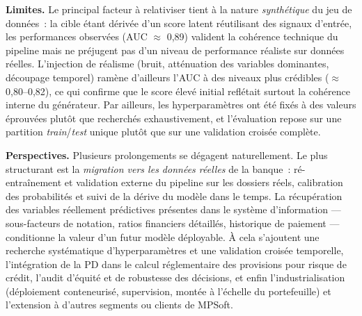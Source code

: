 \documentclass[a4paper,12pt,oneside]{report}
\begin{document}
\medskip
\noindent\textbf{Limites.} Le principal facteur à relativiser tient à la nature
\emph{synthétique} du jeu de données~: la cible étant dérivée d'un score latent réutilisant des
signaux d'entrée, les performances observées (AUC $\approx$ 0{,}89) valident la cohérence
technique du pipeline mais ne préjugent pas d'un niveau de performance réaliste sur données
réelles. L'injection de réalisme (bruit, atténuation des variables dominantes, découpage
temporel) ramène d'ailleurs l'AUC à des niveaux plus crédibles ($\approx$ 0{,}80–0{,}82), ce qui
confirme que le score élevé initial reflétait surtout la cohérence interne du générateur. Par
ailleurs, les hyperparamètres ont été fixés à des valeurs éprouvées plutôt que recherchés
exhaustivement, et l'évaluation repose sur une partition \textit{train}/\textit{test} unique
plutôt que sur une validation croisée complète.

\medskip
\noindent\textbf{Perspectives.} Plusieurs prolongements se dégagent naturellement. Le plus
structurant est la \emph{migration vers les données réelles} de la banque~: ré-entraînement et
validation externe du pipeline sur les dossiers réels, calibration des probabilités et suivi de
la dérive du modèle dans le temps. La récupération des variables réellement prédictives présentes
dans le système d'information — sous-facteurs de notation, ratios financiers détaillés, historique
de paiement — conditionne la valeur d'un futur modèle déployable. À cela s'ajoutent une recherche
systématique d'hyperparamètres et une validation croisée temporelle, l'intégration de la PD dans
le calcul réglementaire des provisions pour risque de crédit, l'audit d'équité et de robustesse
des décisions, et enfin l'industrialisation (déploiement conteneurisé, supervision, montée à
l'échelle du portefeuille) et l'extension à d'autres segments ou clients de MPSoft.
\end{document}
